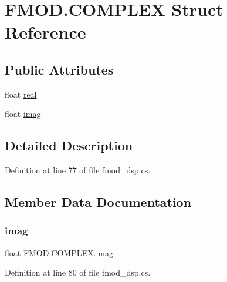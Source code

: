 \hypertarget{struct_f_m_o_d_1_1_c_o_m_p_l_e_x}{}\section{F\+M\+O\+D.\+C\+O\+M\+P\+L\+EX Struct Reference}
\label{struct_f_m_o_d_1_1_c_o_m_p_l_e_x}
\subsection*{Public Attributes}
\begin{DoxyCompactItemize}
\item 
float \hyperlink{struct_f_m_o_d_1_1_c_o_m_p_l_e_x_a613995306b9d959c48c51f162bef622a}{real}
\item 
float \hyperlink{struct_f_m_o_d_1_1_c_o_m_p_l_e_x_af021bcbb49194de2385dba398de4f5b9}{imag}
\end{DoxyCompactItemize}


\subsection{Detailed Description}


Definition at line 77 of file fmod\+\_\+dsp.\+cs.



\subsection{Member Data Documentation}
\mbox{\label{struct_f_m_o_d_1_1_c_o_m_p_l_e_x_af021bcbb49194de2385dba398de4f5b9}} 
\subsubsection{\texorpdfstring{imag}{imag}}
{\footnotesize\ttfamily float F\+M\+O\+D.\+C\+O\+M\+P\+L\+E\+X.\+imag}



Definition at line 80 of file fmod\+\_\+dsp.\+cs.

\mbox{\label{struct_f_m_o_d_1_1_c_o_m_p_l_e_x_a613995306b9d959c48c51f162bef622a}} 
